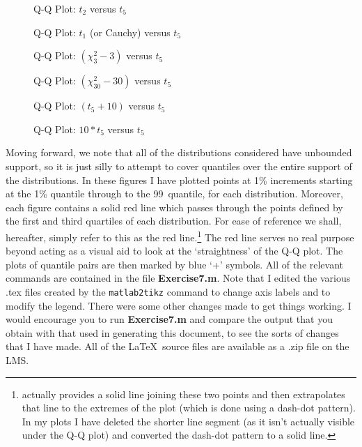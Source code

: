 \begin{figure}[tbp]
   \centering
   
   \caption{Q-Q Plot: \( t_{2} \) versus \( t_{5} \)}
   \label{fig:t2qq}
\end{figure}
\begin{figure}[tbp]
   \centering
   
   \caption{Q-Q Plot: \( t_{1} \) (or Cauchy) versus \( t_{5} \)}
   \label{fig:t1qq}
\end{figure}
\begin{figure}[tbp]
   \centering
   
   \caption{Q-Q Plot: \( (\chi^{2}_{3}-3) \) versus \( t_{5} \)}
   \label{fig:chisq3qq}
\end{figure}
\begin{figure}[tbp]
   \centering
   
   \caption{Q-Q Plot: \( (\chi^{2}_{30}-30) \) versus \( t_{5} \)}
   \label{fig:chisq30qq}
\end{figure}
\begin{figure}[tbp]
   \centering
   
   \caption{Q-Q Plot: \( (t_{5}+10) \) versus \( t_{5} \)}
   \label{fig:nct5qq}
\end{figure}
\begin{figure}[tbp]
   \centering
   
   \caption{Q-Q Plot: \( 10*t_{5} \) versus \( t_{5} \)}
   \label{fig:scaledt5qq}
\end{figure}

Moving forward, we note that all of the distributions considered have unbounded support, so it is
just silly to attempt to cover quantiles over the entire support of the distributions.  In these
figures I have plotted points at 1\% increments starting at the 1\% quantile through to the 99\
quantile, for each distribution.  Moreover, each figure contains a solid red line which passes
through the points defined by the first and third quartiles of each distribution.  For ease of
reference we shall, hereafter, simply refer to this as the red line.\footnote{\matlab actually
provides a solid line joining these two points and then extrapolates that line to the extremes of
the plot (which is done using a dash-dot pattern).  In my plots I have deleted the shorter line
segment (as it isn't actually visible under the Q-Q plot) and converted the dash-dot pattern to a
solid line.} The red line serves no real purpose beyond acting as a visual aid to look at the
`straightness' of the Q-Q plot.  The plots of quantile pairs are then marked by blue `+' symbols.
All of the relevant commands are contained in the file \textbf{Exercise7.m}.  Note that I edited the
various .tex files created by the \texttt{matlab2tikz} command to change axis labels and to modify
the legend.  There were some other changes made to get things working.  I would encourage you to run
\textbf{Exercise7.m} and compare the output that you obtain with that used in generating this
document, to see the sorts of changes that I have made.  All of the \LaTeX\ source files are
available as a .zip file on the LMS.

